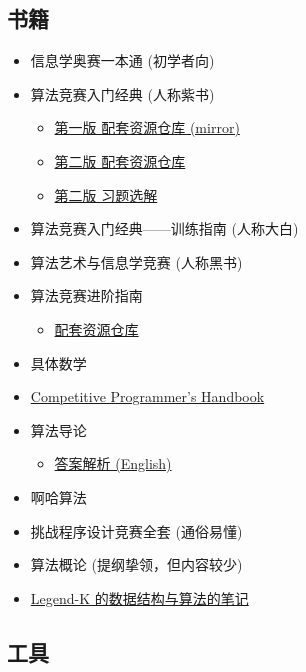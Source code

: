 \subsection{书籍}

\begin{itemize}
\item 信息学奥赛一本通 (初学者向)
\item 算法竞赛入门经典 (人称紫书)
\begin{itemize}
\item \href{https://github.com/sukhoeing/aoapc-book/}{第一版 配套资源仓库 (mirror)}
\item \href{https://github.com/aoapc-book/aoapc-bac2nd}{第二版 配套资源仓库}
\item \href{https://github.com/sukhoeing/aoapc-bac2nd-keys}{第二版 习题选解}
\end{itemize}
\item 算法竞赛入门经典——训练指南 (人称大白)
\item 算法艺术与信息学竞赛 (人称黑书)
\item 算法竞赛进阶指南
\begin{itemize}
\item \href{https://github.com/lydrainbowcat/tedukuri}{配套资源仓库}
\end{itemize}
\item 具体数学
\item \href{https://cses.fi/book/index.html}{Competitive Programmer's Handbook}
\item 算法导论
\begin{itemize}
\item \href{https://github.com/walkccc/CLRS}{答案解析 (English)}
\end{itemize}
\item 啊哈算法
\item 挑战程序设计竞赛全套 (通俗易懂)
\item 算法概论 (提纲挚领，但内容较少)
\item \href{http://www.legend-k.com/Algorithm/Algorithm.pdf}{Legend-K 的数据结构与算法的笔记}
\end{itemize}

\subsection{工具}

